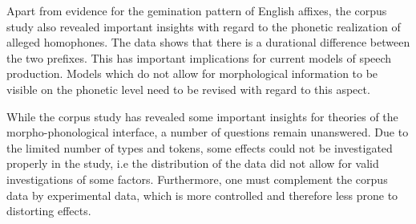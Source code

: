 Apart from evidence for the gemination pattern of English affixes, the corpus study also revealed important insights with regard to the phonetic realization of alleged homophones. The data shows that there is a durational difference between the two prefixes. This has important implications for current models of speech production. Models which do not allow for morphological information to be visible on the phonetic level need to be revised with regard to this aspect.



While the corpus study has revealed some important insights for theories of the morpho-phonological interface, a number of questions remain  unanswered. Due to the limited number of types and tokens, some effects could not be investigated properly in the study, i.e the distribution of the data did not allow for valid investigations of some factors. Furthermore, one must complement the corpus data by experimental data, which is more controlled and therefore less prone to distorting effects.
